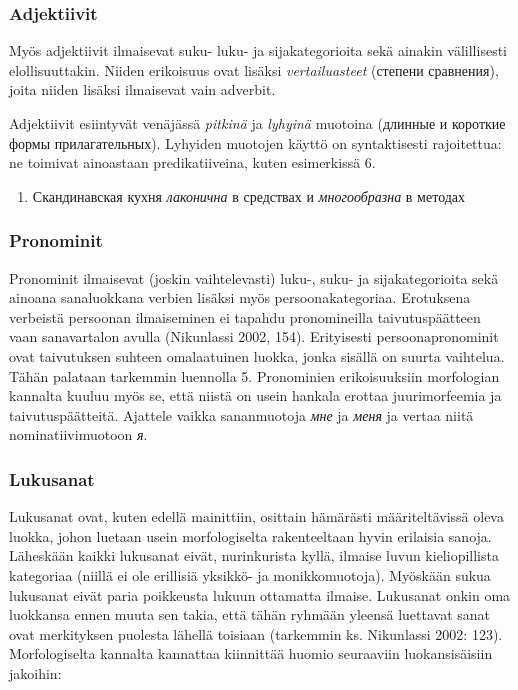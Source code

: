 \documentclass[]{scrartcl}
\providecommand{\tightlist}{%
  \setlength{\itemsep}{0pt}\setlength{\parskip}{0pt}}
\begin{document}
\subsubsection{Adjektiivit}\label{adjektiivit}

Myös adjektiivit ilmaisevat suku- luku- ja sijakategorioita sekä ainakin
välillisesti elollisuuttakin. Niiden erikoisuus ovat lisäksi
\emph{vertailuasteet} (степени сравнения), joita niiden lisäksi
ilmaisevat vain adverbit.

Adjektiivit esiintyvät venäjässä \emph{pitkinä} ja \emph{lyhyinä}
muotoina (длинные и короткие формы прилагательных). Lyhyiden muotojen
käyttö on syntaktisesti rajoitettua: ne toimivat ainoastaan
predikatiiveina, kuten esimerkissä 6.

\begin{enumerate}
\def\labelenumi{(\arabic{enumi})}
\setcounter{enumi}{5}
\tightlist
\item
  Скандинавская кухня \emph{лаконична} в средствах и \emph{многообразна}
  в методах
\end{enumerate}

\subsubsection{Pronominit}\label{pronominit}

Pronominit ilmaisevat (joskin vaihtelevasti) luku-, suku- ja
sijakategorioita sekä ainoana sanaluokkana verbien lisäksi myös
persoonakategoriaa. Erotuksena verbeistä persoonan ilmaiseminen ei
tapahdu pronomineilla taivutuspäätteen vaan sanavartalon avulla
(Nikunlassi 2002, 154). Erityisesti persoonapronominit ovat taivutuksen
suhteen omalaatuinen luokka, jonka sisällä on suurta vaihtelua. Tähän
palataan tarkemmin luennolla 5. Pronominien erikoisuuksiin morfologian
kannalta kuuluu myös se, että niistä on usein hankala erottaa
juurimorfeemia ja taivutuspäätteitä. Ajattele vaikka sananmuotoja
\emph{мне} ja \emph{меня} ja vertaa niitä nominatiivimuotoon \emph{я}.

\subsubsection{Lukusanat}\label{lukusanat}

Lukusanat ovat, kuten edellä mainittiin, osittain hämärästi
määriteltävissä oleva luokka, johon luetaan usein morfologiselta
rakenteeltaan hyvin erilaisia sanoja. Läheskään kaikki lukusanat eivät,
nurinkurista kyllä, ilmaise luvun kieliopillista kategoriaa (niillä ei
ole erillisiä yksikkö- ja monikkomuotoja). Myöskään sukua lukusanat
eivät paria poikkeusta lukuun ottamatta ilmaise. Lukusanat onkin oma
luokkansa ennen muuta sen takia, että tähän ryhmään yleensä luettavat
sanat ovat merkityksen puolesta lähellä toisiaan (tarkemmin ks.
Nikunlassi 2002: 123). Morfologiselta kannalta kannattaa kiinnittää
huomio seuraaviin luokansisäisiin jakoihin:
\end{document}
